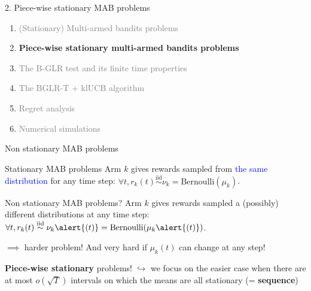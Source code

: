 \documentclass[11pt,english,ignorenonframetext,]{beamer}
\begin{document}
\begin{frame}{2. Piece-wise stationary MAB problems}

  \begin{enumerate}
    \item
    \textcolor{gray}{
      (Stationary) Multi-armed bandits problems
    }
    \vspace*{15pt}

    \item
    \alert{\textbf{%
      Piece-wise stationary multi-armed bandits problems
    }}
    \vspace*{15pt}

    \item
    \textcolor{gray}{
      The B-GLR test and its finite time properties
    }
    \vspace*{15pt}

    \item
    \textcolor{gray}{
      The BGLR-T + klUCB algorithm
    }
    \vspace*{15pt}

    \item
    \textcolor{gray}{
      Regret analysis
    }
    \vspace*{15pt}

    \item
    \textcolor{gray}{
      Numerical simulations
    }
  \end{enumerate}

\end{frame}


\begin{frame}{Non stationary MAB problems}

  \begin{block}{Stationary MAB problems}
    Arm $k$ gives rewards sampled from \textcolor{blue}{the same distribution} for any time step:
    $\forall t, r_k(t) \overset{\text{iid}}{\sim} \nu_k = \mathrm{Bernoulli}(\mu_k)$.
  \end{block}

  \begin{alertblock}{Non stationary MAB problems?}
    Arm $k$ gives rewards sampled a \alert{(possibly) different distributions} at any time step:
    $\forall t, r_k(t) \overset{\text{iid}}{\sim} \nu_k\alert{(t)} = \mathrm{Bernoulli}(\mu_k\alert{(t)})$.
  \end{alertblock}

  \pause
  $\implies$ harder problem!
  And very hard if $\mu_k(t)$ can change at any step!

  \begin{block}{\textbf{Piece-wise stationary} problems!}
    $\hookrightarrow$ we focus on the easier case when there are at most $o(\sqrt{T})$ intervals on which the means are all stationary (= \textbf{sequence})
  \end{block}
\end{frame}
\end{document}
